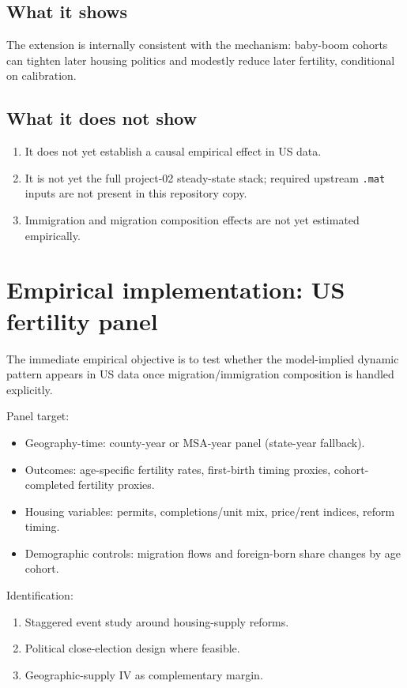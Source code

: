\documentclass[11pt]{article}
\begin{document}
\subsection{What it shows}

The extension is internally consistent with the mechanism:
baby-boom cohorts can tighten later housing politics and modestly reduce later fertility,
conditional on calibration.

\subsection{What it does not show}

\begin{enumerate}
\item It does not yet establish a causal empirical effect in US data.
\item It is not yet the full project-02 steady-state stack; required upstream
      \texttt{.mat} inputs are not present in this repository copy.
\item Immigration and migration composition effects are not yet estimated empirically.
\end{enumerate}

\section{Empirical implementation: US fertility panel}

The immediate empirical objective is to test whether the model-implied dynamic pattern appears in
US data once migration/immigration composition is handled explicitly.

Panel target:
\begin{itemize}
\item Geography-time: county-year or MSA-year panel (state-year fallback).
\item Outcomes: age-specific fertility rates, first-birth timing proxies, cohort-completed fertility proxies.
\item Housing variables: permits, completions/unit mix, price/rent indices, reform timing.
\item Demographic controls: migration flows and foreign-born share changes by age cohort.
\end{itemize}

Identification:
\begin{enumerate}
\item Staggered event study around housing-supply reforms.
\item Political close-election design where feasible.
\item Geographic-supply IV as complementary margin.
\end{enumerate}
\end{document}
